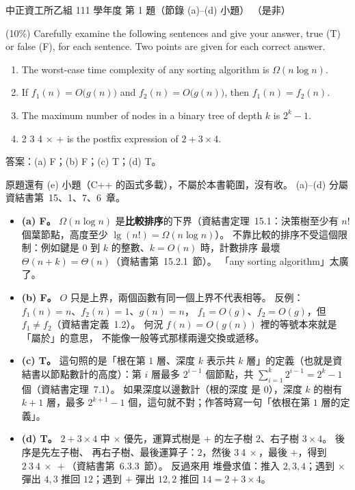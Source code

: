 \begin{pastexam}[label={px:ccu-111-csb-01}]{中正資工所乙組 111 學年度 第 1 題（節錄 (a)--(d) 小題）}
（是非）

(10\%) Carefully examine the following sentences and give your answer, true (T) or false (F), for each
sentence. Two points are given for each correct answer.
\begin{enumerate}[label=(\alph*)]
\item The worst-case time complexity of any sorting algorithm is $\Omega(n\log n)$.
\item If $f_1(n)=O\big(g(n)\big)$ and $f_2(n)=O\big(g(n)\big)$, then $f_1(n)=f_2(n)$.
\item The maximum number of nodes in a binary tree of depth $k$ is $2^k-1$.
\item 2 3 4 $\times$ $+$ is the postfix expression of $2+3\times 4$.
\end{enumerate}
\end{pastexam}

\begin{pastsoln}
答案：(a) F；(b) F；(c) T；(d) T。

原題還有 (e) 小題（C++ 的函式多載），不屬於本書範圍，沒有收。 (a)--(d) 分屬資結書第~15、1、7、6~章。
\begin{itemize}
\item \textbf{(a) F。} $\Omega(n \log n)$ 是\textbf{比較排序}的下界（資結書定理~15.1：決策樹至少有 $n!$ 個葉節點，高度至少
$\lg(n!) = \Omega(n \log n)$）。 不靠比較的排序不受這個限制：例如鍵是 $0$ 到 $k$ 的整數、$k = O(n)$ 時，計數排序
最壞 $\Theta(n + k) = \Theta(n)$（資結書第~15.2.1~節）。 「any sorting algorithm」太廣了。
\item \textbf{(b) F。} $O$ 只是上界，兩個函數有同一個上界不代表相等。 反例：$f_1(n) = n$、$f_2(n) = 1$、$g(n) = n$，
$f_1 = O(g)$、$f_2 = O(g)$，但 $f_1 \ne f_2$（資結書定義~1.2）。 何況 $f(n) = O(g(n))$ 裡的等號本來就是「屬於」的意思，
不能像一般等式那樣兩邊交換或遞移。
\item \textbf{(c) T。} 這句照的是「根在第 $1$ 層、深度 $k$ 表示共 $k$ 層」的定義（也就是資結書以節點數計的高度）：第
$i$ 層最多 $2^{i-1}$ 個節點，共 $\sum_{i=1}^{k} 2^{i-1} = 2^k - 1$ 個（資結書定理~7.1）。 如果深度以邊數計（根的深度
是 $0$），深度 $k$ 的樹有 $k + 1$ 層，最多 $2^{k+1} - 1$ 個，這句就不對；作答時寫一句「依根在第 $1$ 層的定義」。
\item \textbf{(d) T。} $2 + 3 \times 4$ 中 $\times$ 優先，運算式樹是 $+$ 的左子樹 $2$、右子樹 $3 \times 4$。 後序是先左子樹、
再右子樹、最後運算子：$2$，然後 $3\ 4\ \times$，最後 $+$，得到 $2\ 3\ 4\ \times\ +$（資結書第~6.3.3~節）。 反過來用
堆疊求值：推入 $2, 3, 4$；遇到 $\times$ 彈出 $4, 3$ 推回 $12$；遇到 $+$ 彈出 $12, 2$ 推回 $14 = 2 + 3 \times 4$。
\end{itemize}
\end{pastsoln}

